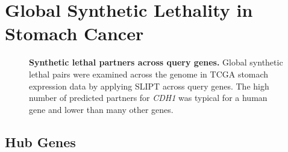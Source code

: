 \chapter{Global Synthetic Lethality in Stomach Cancer}

\begin{figure}[!ht]
\begin{mdframed}
  \begin{center}
   \end{center}
   \caption[Synthetic lethal partners across query genes]{\small \textbf{Synthetic lethal partners across query genes.} Global synthetic lethal pairs were examined across the genome in TCGA stomach expression data by applying SLIPT across query genes. The high number of predicted partners for \textit{CDH1} was typical for a human gene and lower than many other genes.
   }
\label{fig:global_SL_stad}
\end{mdframed}
\end{figure}


\FloatBarrier

\clearpage

\section{Hub Genes}


